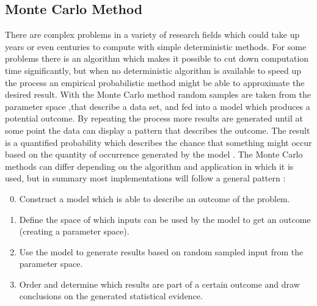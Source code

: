 \subsection{Monte Carlo Method}
There are complex problems in a variety of research fields which could take up years or even centuries to compute with simple deterministic methods. For some problems there is an algorithm which makes it possible to cut down computation time significantly, but when no deterministic algorithm is available to speed up the process an empirical probabilistic method might be able to approximate the desired result. With the Monte Carlo method random samples are taken from the parameter space ,that describe a data set, and fed into a model which produces a potential outcome. By repeating the process more results are generated until at some point the data can display a pattern that describes the outcome. The result is a quantified probability which describes the chance that something might occur based on the quantity of occurrence generated by the model \cite{}.
\newline
\newline
The Monte Carlo methods can differ depending on the algorithm and application in which it is used, but in summary most implementations will follow a general pattern \cite{}:
\begin{enumerate}
	\setcounter{enumi}{-1}
	\item Construct a model which is able to describe an outcome of the problem.
	\item Define the space of which inputs can be used by the model to get an outcome (creating a parameter space). 
	\item Use the model to generate results based on random sampled input from the parameter space.
	\item Order and determine which results are part of a certain outcome and draw conclusions on the generated statistical evidence.
\end{enumerate}

\label{subsec:Monte_Carlo_Method}

